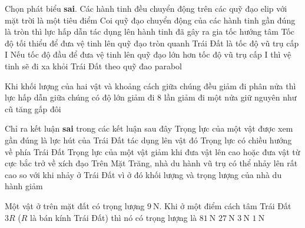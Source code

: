 \begin{ex}
	Chọn phát biểu \textbf{sai}.
	\choice
	{Các hành tinh đều chuyển động trên các quỹ đạo elip với mặt trời là một tiêu điểm}
	{Coi quỹ đạo chuyển động của các hành tinh gần đúng là tròn thì lực hấp dẫn tác dụng lên hành tinh đã gây ra gia tốc hướng tâm}
	{Tốc độ tối thiểu để đưa vệ tinh lên quỹ đạo tròn quanh Trái Đất là tốc độ vũ trụ cấp I}
	{\True Nếu tốc độ đầu để đưa vệ tinh lên quỹ đạo lớn hơn tốc độ vũ trụ cấp I thì vệ tinh sẽ đi xa khỏi Trái Đất theo quỹ đao parabol}
\end{ex}
\begin{ex}
	Khi khối lượng của hai vật và khoảng cách giữa chúng đều giảm đi phân nửa thì lực hấp dẫn giữa chúng có độ lớn 
	\choice
	{giảm đi 8 lần}
	{giảm đi một nửa}
	{\True giữ nguyên như cũ}
	{tăng gấp đôi}
\end{ex}
\begin{ex}
	Chỉ ra kết luận \textbf{sai} trong các kết luận sau đây
	\choice
	{Trọng lực của một vật được xem gần đúng là lực hút của Trái Đất tác dụng lên vật đó}
	{Trọng lực có chiều hướng về phía Trái Đất}
	{Trọng lực của một vật giảm khi đưa vật lên cao hoặc đưa vật từ cực bắc trở về xích đạo}
	{\True Trên Mặt Trăng, nhà du hành vũ trụ có thể nhảy lên rất cao so với khi nhảy ở Trái Đất vì ở đó khối lượng và trọng lượng của nhà du hành giảm}
\end{ex}
\begin{ex}
	Một vật ở trên mặt đất có trọng lượng $\SI{9}{\newton}$. Khi ở một điểm cách tâm Trái Đất $3R$ ($R$ là bán kính Trái Đất) thì nó có trọng lượng là
	\choice
	{$\SI{81}{\newton}$}
	{$\SI{27}{\newton}$}
	{$\SI{3}{\newton}$}
	{\True $\SI{1}{\newton}$}
\end{ex}
